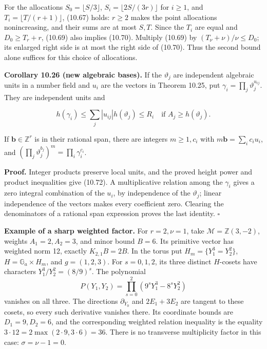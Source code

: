 \documentclass[
  11pt,
  a4paper,
]{article}
\begin{document}
For the allocations \(S_0=\lfloor S/3\rfloor\),
\(S_i=\lfloor2S/(3r)\rfloor\) for \(i\ge1\), and
\(T_i=\lfloor T/(r+1)\rfloor\), (10.67) holds: \(r\ge2\) makes the point
allocations nonincreasing, and their sums are at most \(S,T\). Since the
\(T_i\) are equal and \(D_0\ge T_r+r\), (10.69) also implies (10.70).
Multiply (10.69) by \((T_\nu+\nu)/\nu\le D_0\); its enlarged right side
is at most the right side of (10.70). Thus the second bound alone
suffices for this choice of allocations.

\textbf{Corollary 10.26 (new algebraic bases).} If the \(\vartheta_j\)
are independent algebraic units in a number field and \(u_i\) are the
vectors in Theorem 10.25, put \(\gamma_i=\prod_j\vartheta_j^{u_{ij}}\).
They are independent units and

\[
h(\gamma_i)\le\sum_j|u_{ij}|h(\vartheta_j)\le R_i
\quad\text{if }A_j\ge h(\vartheta_j).
\tag{10.72}
\]

If \(\boldsymbol b\in\mathbb Z^r\) is in their rational span, there are
integers \(m\ge1,c_i\) with \(m\boldsymbol b=\sum_i c_i u_i\), and
\((\prod_j\vartheta_j^{b_j})^m=\prod_i\gamma_i^{c_i}\).

\textbf{Proof.} Integer products preserve local units, and the proved
height power and product inequalities give (10.72). A multiplicative
relation among the \(\gamma_i\) gives a zero integral combination of the
\(u_i\), by independence of the \(\vartheta_j\); linear independence of
the vectors makes every coefficient zero. Clearing the denominators of a
rational span expression proves the last identity. \(\square\)

\textbf{Example of a sharp weighted factor.} For \(r=2,\nu=1\), take
\(\mathcal M=\mathbb Z(3,-2)\), weights \(A_1=2,A_2=3\), and minor bound
\(B=6\). Its primitive vector has weighted norm 12, exactly
\(K_{2,1}B=2B\). In the torus put \(H_m=\{Y_1^3=Y_2^2\}\),
\(H=\mathbb G_a\times H_m\), and \(g=(1,2,3)\). For \(s=0,1,2\), its
three distinct \(H\)-cosets have characters \(Y_1^3/Y_2^2=(8/9)^s\). The
polynomial \[
P(Y_1,Y_2)=\prod_{s=0}^2(9^sY_1^3-8^sY_2^2)
\] vanishes on all three. The directions \(\partial_{Y_0}\) and
\(2E_1+3E_2\) are tangent to these cosets, so every such derivative
vanishes there. Its coordinate bounds are \(D_1=9,D_2=6\), and the
corresponding weighted relation inequality is the equality
\(3\cdot12=2\max(2\cdot9,3\cdot6)=36\). There is no transverse
multiplicity factor in this case: \(\sigma=\nu-1=0\).
\end{document}
